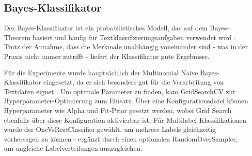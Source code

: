\subsection{Bayes-Klassifikator}
\label{sec:bayes-klassifikator}

Der Bayes-Klassifikator ist ein probabilistisches Modell, das auf dem Bayes-Theorem basiert und häufig für Textklassifizierungsaufgaben verwendet wird \cite{maron_1961}. Trotz der Annahme, dass die Merkmale unabhängig voneinander sind - was in der Praxis nicht immer zutrifft - liefert der Klassifikator gute Ergebnisse.

Für die Experimente wurde hauptsächlich der Multinomial Naive Bayes-Klassifikator eingesetzt, da er sich besonders gut für die Verarbeitung von Textdaten eignet \cite{eyheramendy_2003}. Um optimale Parameter zu finden, kam GridSearchCV zur Hyperparameter-Optimierung zum Einsatz. Über eine Konfigurationsdatei können Hyperparameter wie Alpha und Fit-Prior gesetzt werden, wobei Grid Search ebenfalls über diese Konfiguration aktivierbar ist. Für Multilabel-Klassifikationen wurde der OneVsRestClassifier gewählt, um mehrere Labels gleichzeitig vorhersagen zu können - ergänzt durch einen optionalen RandomOverSampler, um ungleiche Labelverteilungen auszugleichen.

